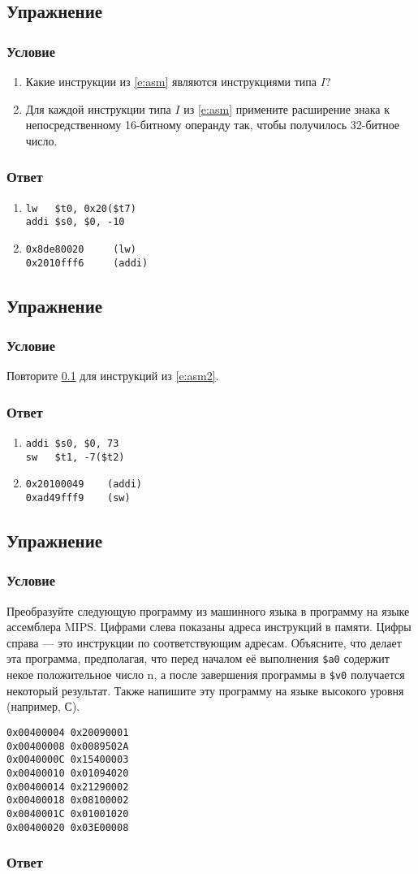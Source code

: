 \documentclass[12pt]{article}
\newenvironment{e}[1][dummy label]{
    \subsection{Упражнение}\label{#1}
    \subsubsection*{Условие}
    }{
    \subsubsection*{Ответ}
}
\newcommand{\eref}[1]{\hyperref[{e:#1}]{\nameref*{e:#1} \ref*{e:#1}}}
\begin{document}
    \begin{e}[e:l-type]
        \begin{enumerate}
            \item Какие инструкции из \eref{asm} являются инструкциями типа $I$?
            \item Для каждой инструкции типа $I$ из \eref{asm} примените расширение знака к непосредственному 16-битному операнду так, чтобы получилось 32-битное число.
        \end{enumerate}
    \end{e}

    \begin{enumerate}
        \item
        \begin{verbatim}
lw   $t0, 0x20($t7)
addi $s0, $0, -10
        \end{verbatim}
        \item
        \begin{verbatim}
0x8de80020     (lw)
0x2010fff6     (addi)
        \end{verbatim}
    \end{enumerate}

    \begin{e}
        Повторите \eref{l-type} для инструкций из \eref{asm2}.
    \end{e}

    \begin{enumerate}
        \item
        \begin{verbatim}
addi $s0, $0, 73
sw   $t1, -7($t2)
        \end{verbatim}
        \item
        \begin{verbatim}
0x20100049    (addi)
0xad49fff9    (sw)
        \end{verbatim}
    \end{enumerate}

    \newpage

    \begin{e}[e:ml]
        Преобразуйте следующую программу из машинного языка в программу на языке ассемблера MIPS. Цифрами слева показаны адреса инструкций в памяти. Цифры справа --- это инструкции по соответствующим адресам. Объясните, что делает эта программа, предполагая, что перед началом её выполнения \texttt{\$a0} содержит некое положительное число n, а после завершения программы в \texttt{\$v0} получается некоторый результат. Также напишите эту программу на языке высокого уровня (например, С).
        \begin{verbatim}
0x00400004 0x20090001
0x00400008 0x0089502A
0x0040000C 0x15400003
0x00400010 0x01094020
0x00400014 0x21290002
0x00400018 0x08100002
0x0040001C 0x01001020
0x00400020 0x03E00008
        \end{verbatim}
    \end{e}
\end{document}
